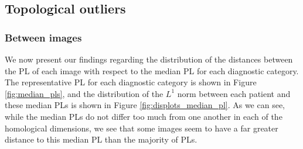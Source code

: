 \documentclass{article}
\begin{document}
\subsection{Topological outliers}

\subsubsection{Between images}

We now present our findings regarding the distribution of the distances between the PL of each image with respect to the median PL for each diagnostic category. The representative PL for each diagnostic category is shown in Figure \ref{fig:median_pls}, and the distribution of the $L^1$ norm between each patient and these median PLs is shown in Figure \ref{fig:displots_median_pl}. As we can see, while the median PLs do not differ too much from one another in each of the homological dimensions, we see that some images seem to have a far greater distance to this median PL than the majority of PLs.
\end{document}
